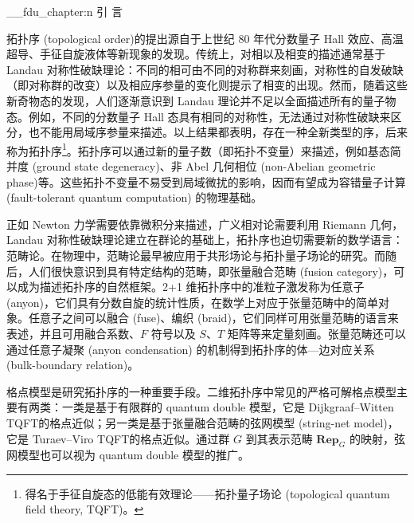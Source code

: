 \ExplSyntaxOn
\__fdu_chapter:n { 引 \quad 言 }
\ExplSyntaxOff

拓扑序 (topological order)\cite{wen1990topological,wen2013topological,wen2017colloquium,zeng2019introduction}的提出源自于上世纪 80 年代分数量子 Hall 效应\cite{tsui1982two,laughlin1983anomalous}、高温超导、手征自旋液体\cite{kalmeyer1987equivalence,wen1989chiral}等新现象的发现。传统上，对相以及相变的描述通常基于 Landau 对称性破缺理论：不同的相可由不同的对称群来刻画，对称性的自发破缺（即对称群的改变）以及相应序参量的变化则提示了相变的出现\cite{landau1980statistical,pathria2011statistical}。然而，随着这些新奇物态的发现，人们逐渐意识到 Landau 理论并不足以全面描述所有的量子物态。例如，不同的分数量子 Hall 态具有相同的对称性，无法通过对称性破缺来区分，也不能用局域序参量来描述\cite{stone1992quantum}。以上结果都表明，存在一种全新类型的序，后来称为拓扑序\footnote{得名于手征自旋态的低能有效理论——拓扑量子场论 (topological quantum field theory, TQFT)\cite{witten1989quantum}。}。拓扑序可以通过新的量子数（即拓扑不变量）来描述，例如基态简并度 (ground state degeneracy)\cite{wen1989vacuum,wen1990ground}、非 Abel 几何相位 (non-Abelian geometric phase)\cite{wen1990topological}等。这些拓扑不变量不易受到局域微扰的影响，因而有望成为容错量子计算 (fault-tolerant quantum computation) 的物理基础\cite{kitaev2003fault,freedman2003topological,nayak2008nonabelian}。

正如 Newton 力学需要依靠微积分来描述，广义相对论需要利用 Riemann 几何，Landau 对称性破缺理论建立在群论的基础上，拓扑序也迫切需要新的数学语言：范畴论。在物理中，范畴论最早被应用于共形场论\cite{segal1988definition,moore1989classical}与拓扑量子场论\cite{atiyah1988topological,turaev1992state}的研究。而随后，人们很快意识到具有特定结构的范畴，即张量融合范畴 (fusion category)，可以成为描述拓扑序的自然框架\cite{levin2005string,kitaev2006anyons}。2+1 维拓扑序中的准粒子激发称为任意子 (anyon)，它们具有分数自旋的统计性质，在数学上对应于张量范畴中的简单对象。任意子之间可以融合 (fuse)、编织 (braid)，它们同样可用张量范畴的语言来表述，并且可用融合系数、$F$ 符号以及 $S$、$T$ 矩阵等来定量刻画\cite{bakalov2001lectures,kitaev2006anyons,bruillard2016rank,aasen2020topological}。张量范畴还可以通过任意子凝聚 (anyon condensation) 的机制得到拓扑序的体—边对应关系 (bulk-boundary relation)\cite{kong2014anyon,kong2014braided,kong2015boundary,kong2017boundary,lou2021dummy}。

格点模型是研究拓扑序的一种重要手段。二维拓扑序中常见的严格可解格点模型主要有两类：一类是基于有限群的 quantum double 模型\cite{kitaev2003fault,kitaev2006anyons}，它是 Dijkgraaf--Witten TQFT\cite{dijkgraaf1990topological}的格点近似；另一类是基于张量融合范畴的弦网模型 (string-net model)\cite{levin2005string}，它是 Turaev--Viro TQFT\cite{turaev1992state,kirillov2011string}的格点近似。通过群 $G$ 到其表示范畴 $\mathbf{Rep}_G$ 的映射，弦网模型也可以视为 quantum double 模型的推广\cite{buerschaper2009mapping,buerschaper2013electric}。


